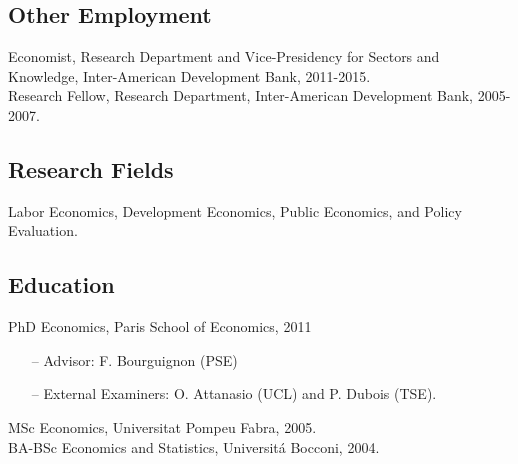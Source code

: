 \documentclass[12pt,english]{article}
\begin{document}
\subsection*{Other Employment}
Economist, Research Department and Vice-Presidency for Sectors and Knowledge, Inter-American Development Bank, 2011-2015. \vspace{0.2cm} \\
Research Fellow, Research Department, Inter-American Development Bank, 2005-2007.

\subsection*{Research Fields}
Labor Economics, Development Economics, Public Economics, and Policy Evaluation.

\subsection*{Education}
PhD Economics, Paris School of Economics, 2011\vspace{-0.2cm} 
\begin{itemize}
\item [--] Advisor: F. Bourguignon (PSE) \vspace{-0.3cm} 
\item [--] External Examiners: O. Attanasio (UCL) and P. Dubois (TSE). \\
\end{itemize} \vspace{-0.5cm} 
MSc Economics, Universitat Pompeu Fabra, 2005.  \vspace{0.2cm} \\
BA-BSc Economics and Statistics, Universit\'{a} Bocconi, 2004.
\end{document}
